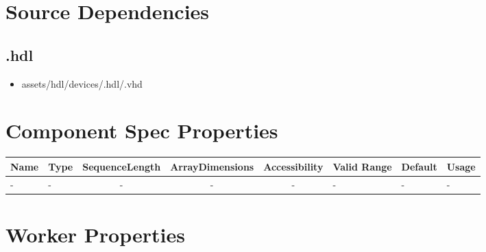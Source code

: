 \section*{Source Dependencies}
\subsection*{\comp.hdl}
\begin{itemize}
	\item assets/hdl/devices/\comp.hdl/\comp.vhd
\end{itemize}

\begin{landscape}
	\section*{Component Spec Properties}
	\begin{scriptsize}
\begin{tabular}{|p{2cm}|p{1.5cm}|c|c|c|p{1.5cm}|p{1cm}|p{7cm}|}
\hline
\rowcolor{blue}
Name                 & Type   & SequenceLength & ArrayDimensions & Accessibility       & Valid Range & Default & Usage
\\
\hline
- & - & - & - & - & -  & - & -
\\
\hline
\end{tabular}
	\end{scriptsize}

	\section*{Worker Properties}

\end{landscape}

